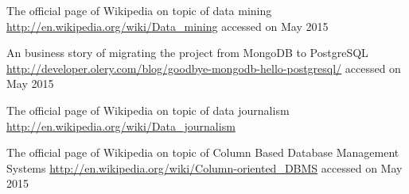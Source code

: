 \begin{thebibliography}{99999}
\singlespace\normalsize

 The official page of Wikipedia on topic of data mining \url{http://en.wikipedia.org/wiki/Data_mining} accessed on May 2015

 An business story of migrating the project from MongoDB to PostgreSQL \url{http://developer.olery.com/blog/goodbye-mongodb-hello-postgresql/} accessed on May 2015

 The official page of Wikipedia on topic of data journalism \url{http://en.wikipedia.org/wiki/Data_journalism}

 The official page of Wikipedia on topic of Column Based Database Management Systems \url{http://en.wikipedia.org/wiki/Column-oriented_DBMS} accessed on May 2015



\end{thebibliography}
